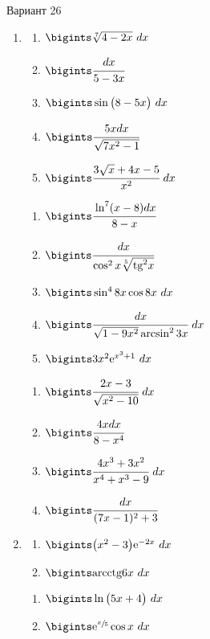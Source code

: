 \documentclass{article}
\begin{document}
\begin{multicols}{2}
	\centerline{Вариант 26}
	\begin{enumerate}[label=\Roman*.]
		\item
		\begin{multicols}{3}
			\begin{enumerate}[label=\arabic*.]
				\setlength\itemsep{1em}
				\item $\bigints\sqrt[7]{4-2x}\ dx$
				\item $\bigints\cfrac{dx}{5-3x}$
				\item $\bigints\sin \big( 8-5x \big)\ dx$
				\item $\bigints\cfrac{5xdx}{\sqrt{7x^2-1}}$
				\item $\bigints\cfrac{3\sqrt{x}+4x-5}{x^2}\ dx$
			\end{enumerate}
			\vfill\null\columnbreak
			\begin{enumerate}[label=\arabic*. , start=6]
				\setlength\itemsep{1em}
				\item $\bigints\cfrac{\ln^7(x-8)dx}{8-x}$
				\item $\bigints\cfrac{dx}{\cos^2x \sqrt[5]{\mbox{tg}^2x}}$
				\item $\bigints \sin^4 8x \cos 8x\ dx$
				\item $\bigints\cfrac{dx}{\sqrt{1-9x^2}\arcsin^2 3x}\ dx$
				\item $\bigints 3x^2\mbox{e}^{x^3 + 1}\ dx$
			\end{enumerate}
			\vfill\null\columnbreak
			\begin{enumerate}[label=\arabic*. , start=11]
				\setlength\itemsep{1em}
				\item $\bigints\cfrac{2x - 3}{\sqrt{x^2 - 10}}\ dx$
				\item $\bigints\cfrac{4xdx}{8-x^4}$
				\item $\bigints\cfrac{4x^3 + 3x^2}{x^4 + x^3 - 9}\ dx$
				\item $\bigints\cfrac{dx}{(7x - 1)^2 + 3}$
			\end{enumerate}
			\vfill\null\columnbreak
		\end{multicols}
		
		\item
		\begin{multicols}{3}
			\begin{enumerate}[label=\arabic*.]
				\setlength\itemsep{1em}
				\item $\bigints\big(x^2 - 3\big)\mbox{e}^{-2x}\ dx$
				\item $\bigints\mbox{arcctg}6x\ dx$
			\end{enumerate}
			\vfill\null\columnbreak
			\begin{enumerate}[label=\arabic*., start=3]
				\setlength\itemsep{1em}
				\item $\bigints\ln\big(5x + 4\big)\ dx$
				\item $\bigints\mbox{e}^{\sfrac{x}{5}}\cos x\ dx$
			\end{enumerate}
			\vfill\null\columnbreak
			\vfill\null\columnbreak
		\end{multicols}
		

\end{enumerate}
\end{multicols}
\end{document}
